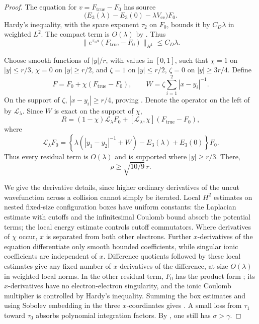 \begin{proof}
The equation for \(v=F_{\mathrm{true}}-F_0\) has source
\[
 \bigl(E_3(\lambda)-E_3(0)-\lambda V_{\mathrm{ee}}\bigr)F_0.
 \]
Hardy's inequality, with the spare exponent \(\tau_2\) on \(F_0\),
bounds it by \(C_D\lambda\) in weighted \(L^2\).
The compact term is \(O(\lambda)\) by .
Thus
\begin{equation}
 \|e^{\tau_1\rho}(F_{\mathrm{true}}-F_0)\|_{H^1}\leq C_D\lambda.
 \label{eq:weighted-state-difference}
\end{equation}

Choose smooth functions of \(|y|/r\), with values in \([0,1]\), such
that \(\chi=1\) on \(|y|\leq r/3\), \(\chi=0\) on \(|y|\geq r/2\),
and \(\zeta=1\) on \(|y|\leq r/2\), \(\zeta=0\) on
\(|y|\geq3r/4\).  Define
\[
 F=F_0+\chi(F_{\mathrm{true}}-F_0),\qquad
 W=\zeta\sum_{i=1}^2|x-y_i|^{-1}.
 \]
On the support of \(\zeta\), \(|x-y_i|\geq r/4\), proving
.  Denote the operator on the
left of  by \(\mathcal L_\lambda\).
Since \(W\) is exact on the support of \(\chi\),
\begin{equation}
 R=(1-\chi)\mathcal L_\lambda F_0
       +[\mathcal L_\lambda,\chi](F_{\mathrm{true}}-F_0),
 \label{eq:cutoff-residual-identity}
\end{equation}
where
\[
 \mathcal L_\lambda F_0
 =\left\{\lambda\left(|y_1-y_2|^{-1}+W\right)
          -E_3(\lambda)+E_3(0)\right\}F_0.
 \]
Thus every residual term is \(O(\lambda)\) and is supported where
\(|y|\geq r/3\).  There,
\begin{equation}
 \rho\geq\sqrt{10/9}\,r.
 \label{eq:cutoff-geometric-margin}
\end{equation}

We give the derivative details, since higher ordinary derivatives
of the uncut wavefunction across a collision cannot simply be
iterated.  Local \(H^2\) estimates on nested fixed-size configuration
boxes have uniform constants: the Laplacian estimate with cutoffs
and the infinitesimal Coulomb bound absorb the potential terms;
the local energy estimate controls cutoff commutators.  Where
derivatives of \(\chi\) occur, \(x\) is separated from both other
electrons.  Further \(x\)-derivatives of the equation differentiate
only smooth bounded coefficients, while singular ionic coefficients
are independent of \(x\).  Difference quotients followed by these
local estimates give any fixed number of \(x\)-derivatives of the
difference, at size \(O(\lambda)\) in weighted local norms.
In the other residual term, \(F_0\) has the product form
; its \(x\)-derivatives have no
electron-electron singularity, and the ionic Coulomb multiplier
is controlled by Hardy's inequality.  Summing the box estimates
and using Sobolev embedding in the three \(x\)-coordinates gives
.  A small loss from \(\tau_1\) toward \(\tau_0\)
absorbs polynomial integration factors.  By
, one still has \(\sigma>\gamma\).


\end{proof}
